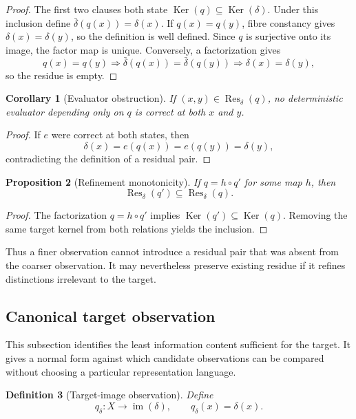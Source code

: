 \documentclass[10pt]{article}
\newtheorem{definition}{Definition}[section]
\newtheorem{proposition}[definition]{Proposition}
\newtheorem{corollary}[definition]{Corollary}
\newcommand{\Res}{\operatorname{Res}}
\newcommand{\Ker}{\operatorname{Ker}}
\begin{document}
\begin{proof}
The first two clauses both state $\Ker(q)\subseteq\Ker(\delta)$.  Under this inclusion define $\bar\delta(q(x))=\delta(x)$.  If $q(x)=q(y)$, fibre constancy gives $\delta(x)=\delta(y)$, so the definition is well defined.  Since $q$ is surjective onto its image, the factor map is unique.  Conversely, a factorization gives
\[
  q(x)=q(y)\Longrightarrow \bar\delta(q(x))=\bar\delta(q(y))
  \Longrightarrow\delta(x)=\delta(y),
\]
so the residue is empty.
\end{proof}

\begin{corollary}[Evaluator obstruction]\label{cor:evaluator}
If $(x,y)\in\Res_\delta(q)$, no deterministic evaluator depending only on $q$ is correct at both $x$ and $y$.
\end{corollary}

\begin{proof}
If $e$ were correct at both states, then
\[
  \delta(x)=e(q(x))=e(q(y))=\delta(y),
\]
contradicting the definition of a residual pair.
\end{proof}

\begin{proposition}[Refinement monotonicity]\label{prop:monotonicity}
If $q=h\circ q'$ for some map $h$, then
\[
  \Res_\delta(q')\subseteq\Res_\delta(q).
\]
\end{proposition}

\begin{proof}
The factorization $q=h\circ q'$ implies $\Ker(q')\subseteq\Ker(q)$.  Removing the same target kernel from both relations yields the inclusion.
\end{proof}

Thus a finer observation cannot introduce a residual pair that was absent from the coarser observation.  It may nevertheless preserve existing residue if it refines distinctions irrelevant to the target.

\subsection{Canonical target observation}

This subsection identifies the least information content sufficient for the target.  It gives a normal form against which candidate observations can be compared without choosing a particular representation language.

\begin{definition}[Target-image observation]
Define
\[
  q_\delta:X\to\operatorname{im}(\delta),\qquad
  q_\delta(x)=\delta(x).
\]
\end{definition}
\end{document}
